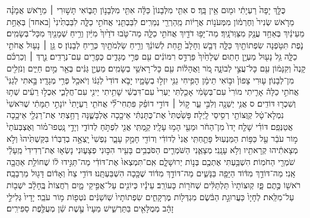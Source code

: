 \documentclass[11pt,twoside]{article}
\begin{document}
{כֻּלָּ֤ךְ יָפָה֙ רַעְיָתִ֔י וּמ֖וּם אֵ֥ין בָּֽךְ׃ ס
אִתִּ֤י מִלְּבָנוֹן֙ כַּלָּ֔ה אִתִּ֖י מִלְּבָנ֣וֹן תָּב֑וֹאִי תָּשׁ֣וּרִי ׀ מֵרֹ֣אשׁ אֲמָנָ֗ה מֵרֹ֤אשׁ שְׂנִיר֙ וְחֶרְמ֔וֹן מִמְּעֹנ֣וֹת אֲרָי֔וֹת מֵֽהַרְרֵ֖י נְמֵרִֽים׃
לִבַּבְתִּ֖נִי אֲחֹתִ֣י כַלָּ֑ה לִבַּבְתִּ֙ינִי֙ [באחד] בְּאַחַ֣ת מֵעֵינַ֔יִךְ בְּאַחַ֥ד עֲנָ֖ק מִצַּוְּרֹנָֽיִךְ׃
מַה־יָּפ֥וּ דֹדַ֖יִךְ אֲחֹתִ֣י כַלָּ֑ה מַה־טֹּ֤בוּ דֹדַ֙יִךְ֙ מִיַּ֔יִן וְרֵ֥יחַ שְׁמָנַ֖יִךְ מִכָּל־בְּשָׂמִֽים׃
נֹ֛פֶת תִּטֹּ֥פְנָה שִׂפְתוֹתַ֖יִךְ כַּלָּ֑ה דְּבַ֤שׁ וְחָלָב֙ תַּ֣חַת לְשׁוֹנֵ֔ךְ וְרֵ֥יחַ שַׂלְמֹתַ֖יִךְ כְּרֵ֥יחַ לְבָנֽוֹן׃ ס
גַּ֥ן ׀ נָע֖וּל אֲחֹתִ֣י כַלָּ֑ה גַּ֥ל נָע֖וּל מַעְיָ֥ן חָתֽוּם׃
שְׁלָחַ֙יִךְ֙ פַּרְדֵּ֣ס רִמּוֹנִ֔ים עִ֖ם פְּרִ֣י מְגָדִ֑ים כְּפָרִ֖ים עִם־נְרָדִֽים׃
נֵ֣רְדְּ ׀ וְכַרְכֹּ֗ם קָנֶה֙ וְקִנָּמ֔וֹן עִ֖ם כָּל־עֲצֵ֣י לְבוֹנָ֑ה מֹ֚ר וַאֲהָל֔וֹת עִ֖ם כָּל־רָאשֵׁ֥י בְשָׂמִֽים׃
מַעְיַ֣ן גַּנִּ֔ים בְּאֵ֖ר מַ֣יִם חַיִּ֑ים וְנֹזְלִ֖ים מִן־לְבָנֽוֹן׃
ע֤וּרִי צָפוֹן֙ וּב֣וֹאִי תֵימָ֔ן הָפִ֥יחִי גַנִּ֖י יִזְל֣וּ בְשָׂמָ֑יו יָבֹ֤א דוֹדִי֙ לְגַנּ֔וֹ וְיֹאכַ֖ל פְּרִ֥י מְגָדָֽיו׃
בָּ֣אתִי לְגַנִּי֮ אֲחֹתִ֣י כַלָּה֒ אָרִ֤יתִי מוֹרִי֙ עִם־בְּשָׂמִ֔י אָכַ֤לְתִּי יַעְרִי֙ עִם־דִּבְשִׁ֔י שָׁתִ֥יתִי יֵינִ֖י עִם־חֲלָבִ֑י אִכְל֣וּ רֵעִ֔ים שְׁת֥וּ וְשִׁכְר֖וּ דּוֹדִֽים׃ ס
אֲנִ֥י יְשֵׁנָ֖ה וְלִבִּ֣י עֵ֑ר ק֣וֹל ׀ דּוֹדִ֣י דוֹפֵ֗ק פִּתְחִי־לִ֞י אֲחֹתִ֤י רַעְיָתִי֙ יוֹנָתִ֣י תַמָּתִ֔י שֶׁרֹּאשִׁי֙ נִמְלָא־טָ֔ל קְוֻּצּוֹתַ֖י רְסִ֥יסֵי לָֽיְלָה׃
פָּשַׁ֙טְתִּי֙ אֶת־כֻּתָּנְתִּ֔י אֵיכָ֖כָה אֶלְבָּשֶׁ֑נָּה רָחַ֥צְתִּי אֶת־רַגְלַ֖י אֵיכָ֥כָה אֲטַנְּפֵֽם׃
דּוֹדִ֗י שָׁלַ֤ח יָדוֹ֙ מִן־הַחֹ֔ר וּמֵעַ֖י הָמ֥וּ עָלָֽיו׃
קַ֥מְתִּֽי אֲנִ֖י לִפְתֹּ֣חַ לְדוֹדִ֑י וְיָדַ֣י נָֽטְפוּ־מ֗וֹר וְאֶצְבְּעֹתַי֙ מ֣וֹר עֹבֵ֔ר עַ֖ל כַּפּ֥וֹת הַמַּנְעֽוּל׃
פָּתַ֤חְתִּֽי אֲנִי֙ לְדוֹדִ֔י וְדוֹדִ֖י חָמַ֣ק עָבָ֑ר נַפְשִׁי֙ יָֽצְאָ֣ה בְדַבְּר֔וֹ בִּקַּשְׁתִּ֙יהוּ֙ וְלֹ֣א מְצָאתִ֔יהוּ קְרָאתִ֖יו וְלֹ֥א עָנָֽנִי׃
מְצָאֻ֧נִי הַשֹּׁמְרִ֛ים הַסֹּבְבִ֥ים בָּעִ֖יר הִכּ֣וּנִי פְצָע֑וּנִי נָשְׂא֤וּ אֶת־רְדִידִי֙ מֵֽעָלַ֔י שֹׁמְרֵ֖י הַחֹמֽוֹת׃
הִשְׁבַּ֥עְתִּי אֶתְכֶ֖ם בְּנ֣וֹת יְרוּשָׁלָ֑͏ִם אִֽם־תִּמְצְאוּ֙ אֶת־דּוֹדִ֔י מַה־תַּגִּ֣ידוּ ל֔וֹ שֶׁחוֹלַ֥ת אַהֲבָ֖ה אָֽנִי׃
מַה־דּוֹדֵ֣ךְ מִדּ֔וֹד הַיָּפָ֖ה בַּנָּשִׁ֑ים מַה־דּוֹדֵ֣ךְ מִדּ֔וֹד שֶׁכָּ֖כָה הִשְׁבַּעְתָּֽנוּ׃
דּוֹדִ֥י צַח֙ וְאָד֔וֹם דָּג֖וּל מֵרְבָבָֽה׃
רֹאשׁ֖וֹ כֶּ֣תֶם פָּ֑ז קְוּצּוֹתָיו֙ תַּלְתַּלִּ֔ים שְׁחֹר֖וֹת כָּעוֹרֵֽב׃
עֵינָ֕יו כְּיוֹנִ֖ים עַל־אֲפִ֣יקֵי מָ֑יִם רֹֽחֲצוֹת֙ בֶּֽחָלָ֔ב יֹשְׁב֖וֹת עַל־מִלֵּֽאת׃
לְחָיָו֙ כַּעֲרוּגַ֣ת הַבֹּ֔שֶׂם מִגְדְּל֖וֹת מֶרְקָחִ֑ים שִׂפְתוֹתָיו֙ שֽׁוֹשַׁנִּ֔ים נֹטְפ֖וֹת מ֥וֹר עֹבֵֽר׃
יָדָיו֙ גְּלִילֵ֣י זָהָ֔ב מְמֻלָּאִ֖ים בַּתַּרְשִׁ֑ישׁ מֵעָיו֙ עֶ֣שֶׁת שֵׁ֔ן מְעֻלֶּ֖פֶת סַפִּירִֽים׃
}
\end{document}

